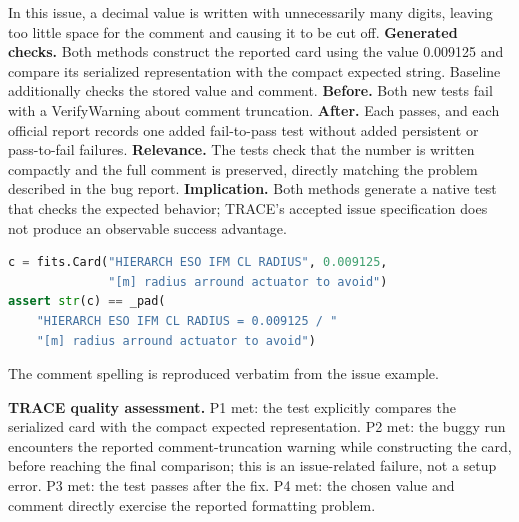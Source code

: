 In this issue, a decimal value is written with unnecessarily many digits, leaving too little space for the comment and causing it to be cut off. \textbf{Generated checks.} Both methods construct the reported card using the value 0.009125 and compare its serialized representation with the compact expected string. Baseline additionally checks the stored value and comment. \textbf{Before.} Both new tests fail with a VerifyWarning about comment truncation. \textbf{After.} Each passes, and each official report records one added fail-to-pass test without added persistent or pass-to-fail failures. \textbf{Relevance.} The tests check that the number is written compactly and the full comment is preserved, directly matching the problem described in the bug report. \textbf{Implication.} Both methods generate a native test that checks the expected behavior; TRACE's accepted issue specification does not produce an observable success advantage.
\begin{lstlisting}[language=Python,caption={Shared Astropy oracle, condensed from the submitted tests.}]
c = fits.Card("HIERARCH ESO IFM CL RADIUS", 0.009125,
              "[m] radius arround actuator to avoid")
assert str(c) == _pad(
    "HIERARCH ESO IFM CL RADIUS = 0.009125 / "
    "[m] radius arround actuator to avoid")
\end{lstlisting}
The comment spelling  is reproduced verbatim from the issue example.

\textbf{TRACE quality assessment.} P1 met: the test explicitly compares the serialized card with the compact expected representation. P2 met: the buggy run encounters the reported comment-truncation warning while constructing the card, before reaching the final comparison; this is an issue-related failure, not a setup error. P3 met: the test passes after the fix. P4 met: the chosen value and comment directly exercise the reported formatting problem.

